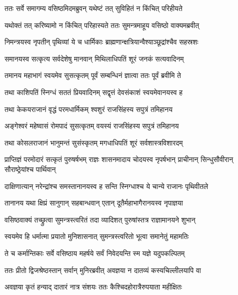 \twolineshloka
{ततः सर्वे समागम्य वसिष्ठमिदमब्रुवन्}
{यथेष्टं तत् सुविहितं न किंचित् परिहीयते} %

\twolineshloka
{यथोक्तं तत् करिष्यामो न किंचित् परिहास्यते}
{ततः सुमन्त्रमाहूय वसिष्ठो वाक्यमब्रवीत्} %

\twolineshloka
{निमन्त्रयस्व नृपतीन् पृथिव्यां ये च धार्मिकाः}
{ब्राह्मणान्क्षत्रियान्वैश्याञ्छूद्रांश्चैव सहस्रशः} %

\twolineshloka
{समानयस्व सत्कृत्य सर्वदेशेषु मानवान्}
{मिथिलाधिपतिं शूरं जनकं सत्यवादिनम्} %

\twolineshloka
{तमानय महाभागं स्वयमेव सुसत्कृतम्}
{पूर्वं सम्बन्धिनं ज्ञात्वा ततः पूर्वं ब्रवीमि ते} %

\twolineshloka
{तथा काशिपतिं स्निग्धं सततं प्रियवादिनम्}
{सद्वृत्तं देवसंकाशं स्वयमेवानयस्व ह} %

\twolineshloka
{तथा केकयराजानं वृद्धं परमधार्मिकम्}
{श्वशुरं राजसिंहस्य सपुत्रं तमिहानय} %

\twolineshloka
{अङ्गेश्वरं महेष्वासं रोमपादं सुसत्कृतम्}
{वयस्यं राजसिंहस्य सपुत्रं तमिहानय} %

\twolineshloka
{तथा कोसलराजानं भानुमन्तं सुसंस्कृतम्}
{मगधाधिपतिं शूरं सर्वशास्त्रविशारदम्} %

\threelineshloka
{प्राप्तिज्ञं परमोदारं सत्कृतं पुरुषर्षभम्}
{राज्ञः शासनमादाय चोदयस्व नृपर्षभान्}
{प्राचीनान् सिन्धुसौवीरान् सौराष्ठ्रेयांश्च पार्थिवान्} %

\twolineshloka
{दाक्षिणात्यान् नरेन्द्रांश्च समस्तानानयस्व ह}
{सन्ति स्निग्धाश्च ये चान्ये राजानः पृथिवीतले} %

\twolineshloka
{तानानय यथा क्षिप्रं सानुगान् सहबान्धवान्}
{एतान् दूतैर्महाभागैरानयस्व नृपाज्ञया} %

\twolineshloka
{वसिष्ठवाक्यं तच्छ्रुत्वा सुमन्त्रस्त्वरितं तदा}
{व्यादिशत् पुरुषांस्तत्र राज्ञामानयने शुभान्} %

\twolineshloka
{स्वयमेव हि धर्मात्मा प्रयातो मुनिशासनात्}
{सुमन्त्रस्त्वरितो भूत्वा समानेतुं महामतिः} %

\twolineshloka
{ते च कर्मान्तिकाः सर्वे वसिष्ठाय महर्षये}
{सर्वं निवेदयन्ति स्म यज्ञे यदुपकल्पितम्} %

\twolineshloka
{ततः प्रीतो द्विजश्रेष्ठस्तान् सर्वान् मुनिरब्रवीत्}
{अवज्ञया न दातव्यं कस्यचिल्लीलयापि वा} %

\twolineshloka
{अवज्ञया कृतं हन्याद् दातारं नात्र संशयः}
{ततः कैश्चिदहोरात्रैरुपयाता महीक्षितः} %

